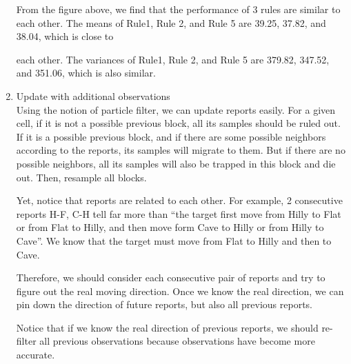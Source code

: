 \documentclass[letter]{article}
\begin{document}
\begin{enumerate}
	From the figure above, we find that the performance of 3 rules are similar to each other.
	The means of Rule1, Rule 2, and Rule 5 are 39.25, 37.82, and 38.04, which is close to
	
	each other. The variances of Rule1, Rule 2, and Rule 5 are 379.82, 347.52, and 351.06,
	which is also similar.
	
	\item {Update with additional observations} \\
	Using the notion of particle filter, we can update reports easily. For a given cell, if it is not a possible previous block, all its samples should be ruled out. If it is a possible previous block, and if there are some possible neighbors according to the reports, its samples will migrate to them. But if there are no possible neighbors, all its samples will also be trapped in this block and die out. Then, resample all blocks.
	
	Yet, notice that reports are related to each other. For example, 2 consecutive reports H-F, C-H tell far more than “the target first move from Hilly to Flat or from Flat to Hilly, and then move form Cave to Hilly or from Hilly to Cave”. We know that the target must move from Flat to Hilly and then to Cave.
	
	Therefore, we should consider each consecutive pair of reports and try to figure out the real moving direction. Once we know the real direction, we can pin down the direction of future reports, but also all previous reports.
	
	Notice that if we know the real direction of previous reports, we should re-filter all previous observations because observations have become more accurate.
	

\end{enumerate}
\end{document}
